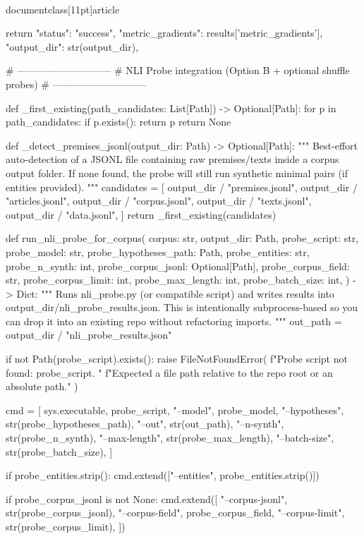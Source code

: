 \\documentclass[11pt]{article}
\begin{document}
\begin{CodeBlock}
    return {
        "status": "success",
        "metric_gradients": results['metric_gradients'],
        "output_dir": str(output_dir),
    }


# -----------------------------
# NLI Probe integration (Option B + optional shuffle probes)
# -----------------------------

def _first_existing(path_candidates: List[Path]) -> Optional[Path]:
    for p in path_candidates:
        if p.exists():
            return p
    return None


def _detect_premises_jsonl(output_dir: Path) -> Optional[Path]:
    """
    Best-effort auto-detection of a JSONL file containing raw premises/texts inside a corpus output folder.
    If none found, the probe will still run synthetic minimal pairs (if entities provided).
    """
    candidates = [
        output_dir / "premises.jsonl",
        output_dir / "articles.jsonl",
        output_dir / "corpus.jsonl",
        output_dir / "texts.jsonl",
        output_dir / "data.jsonl",
    ]
    return _first_existing(candidates)


def run_nli_probe_for_corpus(
    corpus: str,
    output_dir: Path,
    probe_script: str,
    probe_model: str,
    probe_hypotheses_path: Path,
    probe_entities: str,
    probe_n_synth: int,
    probe_corpus_jsonl: Optional[Path],
    probe_corpus_field: str,
    probe_corpus_limit: int,
    probe_max_length: int,
    probe_batch_size: int,
) -> Dict:
    """
    Runs nli_probe.py (or compatible script) and writes results into output_dir/nli_probe_results.json.
    This is intentionally subprocess-based so you can drop it into an existing repo without refactoring imports.
    """
    out_path = output_dir / "nli_probe_results.json"

    if not Path(probe_script).exists():
        raise FileNotFoundError(
            f"Probe script not found: {probe_script}. "
            f"Expected a file path relative to the repo root or an absolute path."
        )

    cmd = [
        sys.executable,
        probe_script,
        "--model", probe_model,
        "--hypotheses", str(probe_hypotheses_path),
        "--out", str(out_path),
        "--n-synth", str(probe_n_synth),
        "--max-length", str(probe_max_length),
        "--batch-size", str(probe_batch_size),
    ]

    if probe_entities.strip():
        cmd.extend(["--entities", probe_entities.strip()])

    if probe_corpus_jsonl is not None:
        cmd.extend([
            "--corpus-jsonl", str(probe_corpus_jsonl),
            "--corpus-field", probe_corpus_field,
            "--corpus-limit", str(probe_corpus_limit),
        ])


\end{CodeBlock}
\end{document}
